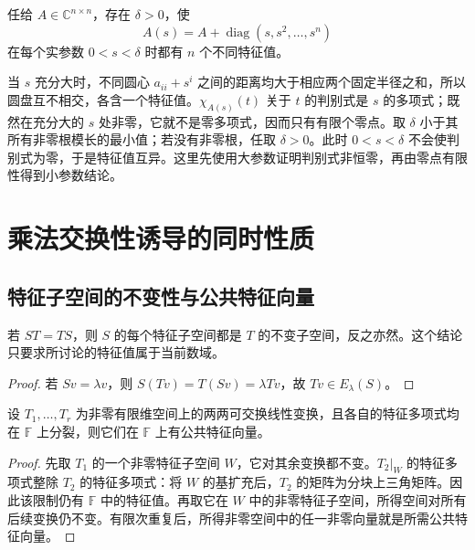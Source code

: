 \begin{example}
任给 $A\in\mathbb C^{n\times n}$，存在 $\delta>0$，使
\[
A(s)=A+\operatorname{diag}(s,s^2,\ldots,s^n)
\]
在每个实参数 $0<s<\delta$ 时都有 $n$ 个不同特征值。
\end{example}
\begin{solve}
当 $s$ 充分大时，不同圆心 $a_{ii}+s^i$ 之间的距离均大于相应两个固定半径之和，所以圆盘互不相交，各含一个特征值。$\chi_{A(s)}(t)$ 关于 $t$ 的判别式是 $s$ 的多项式；既然在充分大的 $s$ 处非零，它就不是零多项式，因而只有有限个零点。取 $\delta$ 小于其所有非零根模长的最小值；若没有非零根，任取 $\delta>0$。此时 $0<s<\delta$ 不会使判别式为零，于是特征值互异。这里先使用大参数证明判别式非恒零，再由零点有限性得到小参数结论。
\end{solve}

\section{乘法交换性诱导的同时性质}
\label{sec:xie-ex-eig-simultaneous}

\subsection{特征子空间的不变性与公共特征向量}

\begin{proposition}
\label{prop:xie-ex-eig-commuting-invariance}
若 $ST=TS$，则 $S$ 的每个特征子空间都是 $T$ 的不变子空间，反之亦然。这个结论只要求所讨论的特征值属于当前数域。
\end{proposition}
\begin{proof}
若 $Sv=\lambda v$，则 $S(Tv)=T(Sv)=\lambda Tv$，故 $Tv\in E_\lambda(S)$。
\end{proof}

\begin{theorem}
\label{thm:xie-ex-eig-common-eigenvector}
设 $T_1,\ldots,T_r$ 为非零有限维空间上的两两可交换线性变换，且各自的特征多项式均在 $\mathbb F$ 上分裂，则它们在 $\mathbb F$ 上有公共特征向量。
\end{theorem}
\begin{proof}
先取 $T_1$ 的一个非零特征子空间 $W$，它对其余变换都不变。$T_2|_W$ 的特征多项式整除 $T_2$ 的特征多项式：将 $W$ 的基扩充后，$T_2$ 的矩阵为分块上三角矩阵。因此该限制仍有 $\mathbb F$ 中的特征值。再取它在 $W$ 中的非零特征子空间，所得空间对所有后续变换仍不变。有限次重复后，所得非零空间中的任一非零向量就是所需公共特征向量。
\end{proof}

